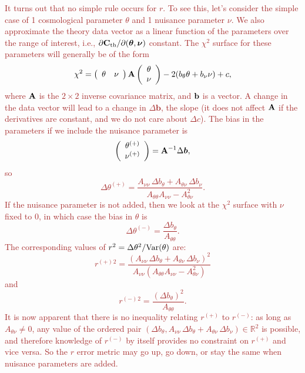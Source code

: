 \documentclass[usenatbib]{mnras}
\newcommand{\changetext}[1]{\textcolor{brown}{#1}}
\begin{document}
\changetext{It turns out that no simple rule occurs for $r$. To see this, let's consider the simple case of 1 cosmological parameter $\theta$ and 1 nuisance parameter $\nu$. We also approximate the theory data vector as a linear function of the parameters over the range of interest, i.e., $\partial{\bf C}_{\rm th}/\partial({\boldsymbol\theta},{\boldsymbol\nu})$ constant. The $\chi^2$ surface for these parameters will generally be of the form
\begin{equation}
\chi^2 = \left( \begin{array}{cc} \theta & \nu \end{array} \right) {\bf A}  \left( \begin{array}c \theta \\ \nu \end{array} \right)
- 2 (b_\theta \theta + b_\nu\nu) + c,
\end{equation}
where ${\bf A}$ is the $2\times 2$ inverse covariance matrix, and ${\bf b}$ is a vector. A change in the data vector will lead to a change in $\Delta{\boldsymbol b}$, the slope (it does not affect ${\bf A}$ if the derivatives are constant, and we do not care about $\Delta c$). The bias in the parameters if we include the nuisance parameter is
\begin{equation}
\left( \begin{array}c \theta^{(+)} \\ \nu^{(+)} \end{array} \right) = {\bf A}^{-1}\Delta{\boldsymbol b},
\end{equation}
so
\begin{equation}
\Delta\theta^{(+)} = \frac{A_{\nu\nu}\,\Delta b_\theta + A_{\theta\nu}\,\Delta b_\nu}{A_{\theta\theta} A_{\nu\nu} - A_{\theta\nu}^2}.
\end{equation}
If the nuisance parameter is not added, then we look at the $\chi^2$ surface with $\nu$ fixed to 0, in which case the bias in $\theta$ is
\begin{equation}
\Delta\theta^{(-)} = \frac{\Delta b_\theta}{A_{\theta\theta}}.
\end{equation}
The corresponding values of $r^2 = \Delta\theta^2 / {\rm Var}(\theta)$ are:
\begin{equation}
r^{(+)}{^2} = \frac{(A_{\nu\nu}\,\Delta b_\theta + A_{\theta\nu}\,\Delta b_\nu)^2}{A_{\nu\nu}(A_{\theta\theta} A_{\nu\nu} - A_{\theta\nu}^2)}
\end{equation}
and
\begin{equation}
r^{(-)}{^2} = \frac{(\Delta b_\theta)^2}{A_{\theta\theta}}.
\end{equation}
It is now apparent that there is no inequality relating $r^{(+)}$ to $r^{(-)}$: as long as $A_{\theta\nu}\neq 0$, any value of the ordered pair $(\Delta b_\theta, A_{\nu\nu}\,\Delta b_\theta + A_{\theta\nu}\,\Delta b_\nu)\in{\mathbb R}^2$ is possible, and therefore knowledge of $r^{(-)}$ by itself provides no constraint on $r^{(+)}$ and vice versa. So the $r$ error metric may go up, go down, or stay the same when nuisance parameters are added.
}
\end{document}
